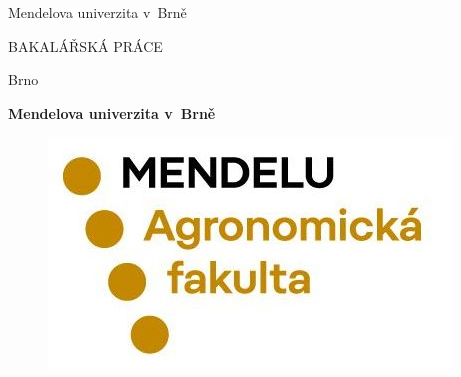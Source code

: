 \documentclass[12pt,a4paper,oneside]{article}
\begin{document}

\pagestyle{empty}


\begin{center}
{\fontsize{18pt}{1.5}\selectfont Mendelova univerzita v~Brně} 

{\fontsize{18pt}{1.5}\selectfont {\the\NazevFakulty}} 
\end{center}

\vspace{9cm}

\begin{center}
{\fontsize{22pt}{12pt}\selectfont BAKALÁŘSKÁ PRÁCE}
\end{center}

\vfill

\begin{flushleft}
\fontsize{18pt}{12pt}\selectfont Brno {\the\Rok} \hfill {\the\JmenoStudenta}
\end{flushleft}




\newpage
\begin{center}
{\fontsize{16pt}{1pt}\selectfont \textbf{Mendelova univerzita v~Brně}} 

{\fontsize{16pt}{1pt}\selectfont \textbf{\the\NazevFakulty}} 

{\fontsize{16pt}{1pt}\selectfont \textbf{\the\NazevUstavu}} 
\end{center}
\vspace{-1cm}
\hrulefill

\vspace{1cm}

\begin{figure}[htpb]
\centering
\includegraphics[scale=0.46]{mendelu.jpg}
\end{figure}
\end{document}
